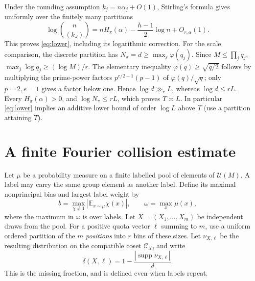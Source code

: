 \documentclass[11pt]{article}
\theoremstyle{definition}\newtheorem{remark}[theorem]{Remark}
\newcommand{\G}{\mathcal U}
\newcommand{\E}{\mathbb E}
\newcommand{\comp}{\mathcal C}
\newcommand{\abs}[1]{\left|#1\right|}
\begin{document}
Under the rounding assumption $k_j=n\alpha_j+O(1)$, Stirling's formula gives uniformly over the finitely many partitions
\[
 \log\binom n{(k_J)}=n H_\pi(\alpha)-\frac{h-1}{2}\log n+O_{r,\alpha}(1).
\]
This proves \eqref{eq:lower}, including its logarithmic correction. For the scale comparison, the discrete partition has $N_\pi=d\ge\max_j\varphi(q_j)$. Since $M\le\prod_j q_j$, $\max_j\log q_j\ge (\log M)/r$. The elementary inequality $\varphi(q)\ge\sqrt{q/2}$ follows by multiplying the prime-power factors $p^{e/2-1}(p-1)$ of $\varphi(q)/\sqrt q$; only $p=2,e=1$ gives a factor below one. Hence $\log d\gg_r L$, whereas $\log d\le r L$. Every $H_\pi(\alpha)>0$, and $\log N_\pi\le r L$, which proves $T\asymp L$. In particular \eqref{eq:lower} implies an additive lower bound of order $\log L$ above $T$ (use a partition attaining $T$).

\section{A finite Fourier collision estimate}\label{sec:collision}
Let $\mu$ be a probability measure on a finite labelled pool of elements of $\G(M)$. A label may carry the same group element as another label. Define its maximal nonprincipal bias and largest label weight by
\begin{equation}\label{eq:bias}
 b=\max_{\chi\ne1}\abs{\E_{x\sim\mu}\chi(x)},\qquad \omega=\max_x\mu(x),
\end{equation}
where the maximum in $\omega$ is over labels. Let $X=(X_1,\dots,X_m)$ be independent draws from the pool. For a positive quota vector $\ell$ summing to $m$, use a uniform ordered partition of the $m$ \emph{positions} into $r$ bins of these sizes. Let $\nu_{X,\ell}$ be the resulting distribution on the compatible coset $\comp_X$, and write
\[
 \delta(X,\ell)=1-\frac{|\operatorname{supp}\nu_{X,\ell}|}{d} .
\]
This is the missing fraction, and is defined even when labels repeat.
\end{document}
